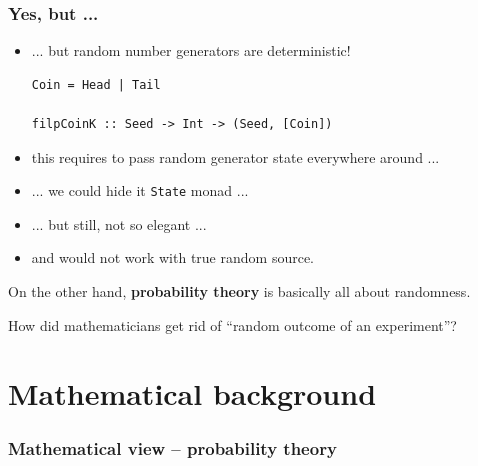 \documentclass[mathserif, 8pt]{beamer}
\newcommand{\muted}[1]{{\mfont#1}}
\newcommand{\Reals}{\mathbb{R}}
\def\fs{\vskip0ex}
\begin{document}
\begin{frame}[fragile]
  \frametitle{Yes, but ...}
  \begin{itemize}
  \item ... but random number generators are deterministic!

\begin{verbatim}
Coin = Head | Tail

filpCoinK :: Seed -> Int -> (Seed, [Coin])
\end{verbatim}

    \pause
  \item this requires to pass random generator state everywhere around ...
    \pause
  \item ... we could hide it \verb|State| monad ...
  \item ... but still, not so elegant ...
  \item and would not work with true random source.
  \end{itemize}

    \pause

  On the other hand, \textbf{probability theory} is basically
  all about randomness.

  \alert{How did mathematicians get rid of ``random outcome of an experiment''?}
\end{frame}

\section{Mathematical background}

\begin{frame}
  \frametitle{Mathematical view -- probability theory}


\end{frame}
\end{document}
